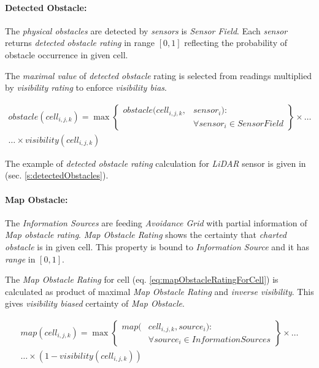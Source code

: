\paragraph{Detected Obstacle:} The \emph{physical obstacles} are detected by \emph{sensors} is \emph{Sensor Field}. Each \emph{sensor} returns \emph{detected obstacle rating} in  range $[0,1]$ reflecting the probability of obstacle occurrence in given cell.

The \emph{maximal value} of \emph{detected obstacle} rating is selected from readings multiplied by \emph{visibility rating} to enforce \emph{visibility bias}.

\begin{multline}\label{eq:detectedObstacleRatingForCell}
    obstacle(cell_{i,j,k}) = \max \left\{\begin{aligned}obstacle(cell_{i,j,k},&sensor_i):\\&\forall sensor_i \in SensorField\end{aligned}\right\}\times\dots\\\dots\times visibility(cell_{i,j,k})
\end{multline}

\noindent The example of \emph{detected obstacle rating} calculation for \emph{LiDAR} sensor is given in (sec. \ref{s:detectedObstacles}).

\paragraph{Map Obstacle:} The \emph{Information Sources} are feeding \emph{Avoidance Grid} with partial information of \emph{Map obstacle rating}. \emph{Map Obstacle Rating} shows the certainty that \emph{charted obstacle} is in given cell. This property is bound to \emph{Information Source} and it has \emph{range} in  $[0,1]$.

The \emph{Map Obstacle Rating} for cell (eq. \ref{eq:mapObstacleRatingForCell}) is calculated as product of maximal \emph{Map Obstacle Rating} and \emph{inverse visibility}. This gives \emph{visibility biased} certainty of \emph{Map Obstacle}.

\begin{multline}\label{eq:mapObstacleRatingForCell}
    map(cell_{i,j,k}) = \max 
    \left\{\begin{aligned}map(&cell_{i,j,k},source_i):\\&\forall source_i \in InformationSources\end{aligned}\right\}\times\dots\\\dots\times \left(1-visibility(cell_{i,j,k})\right)
\end{multline}

